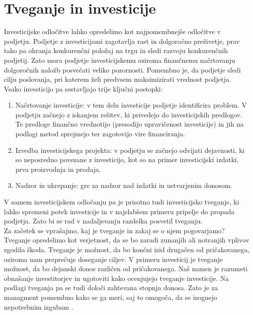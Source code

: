 \section {Tveganje in investicije}
Investicijske odločitve lahko opredelimo kot najpomembnejše odločitve v podjetju. Podjetje z investicijami zagotavlja rast in dolgoročno preživetje, prav tako pa ohranja konkurenčni položaj na trgu in  sledi razvoju konkurenčnih podjetij. Zato mora podjetje investicijskemu oziroma finančnemu načrtovanju dolgoročnih naložb posvečati veliko pozornosti. Pomembno je, da podjetje sledi cilju poslovanja, pri katerem želi predvsem maksimizirati vrednost podjetja. Vsako investicijo pa sestavljajo trije ključni postopki:
\begin{enumerate}
\item{Načrtovanje investicije}: v tem delu investicije podjetje identificira problem. V podjetju začnejo z iskanjem rešitev, ki privedejo do investicijskih predlogov. Te predloge finančno vrednotijo (presodijo upravičenost investicije) in jih na podlagi metod sprejmejo ter zagotovijo vire financiranja.
\item{Izvedba investicijskega projekta}: v podjetju se začnejo odvijati dejavnosti, ki so neposredno povezane z investicijo, kot so na primer investicijski izdatki, prva proizvodnja in prodaja.
\item{Nadzor in ukrepanje}: gre za nadzor nad izdatki in ustvarjenim donosom.
\end{enumerate}

V samem investicijskem odločanju pa je prisotno tudi investicijsko tveganje, ki lahko spremeni potek investicije in v najslabšem primeru pripelje do propada podjetja. Zato bi se rad v nadaljevanju razdelka posvetil tveganju.\\

Za začetek se vprašajmo, kaj je tveganje in zakaj se o njem pogovarjamo?\\
Tveganje opredelimo kot verjetnost, da se bo zaradi zunanjih ali notranjih vplivov zgodila škoda. Tveganje je možnost, da bo končni izid drugačen od pričakovanega, oziroma nam preprečuje doseganje ciljev. V primeru investicij je tveganje možnost, da bo dejanski donos različen od pričakovanega. Naš namen je razumeti obnašanje investitorjev in ugotoviti kako ocenjujejo tveganje investicije. Na podlagi tveganja pa se tudi določi zahtevana stopnja donosa. Zato je za managment pomembno kako se ga meri, saj to omogoča, da se izognejo nepotrebnim izgubam \cite{investopedia}. \\

